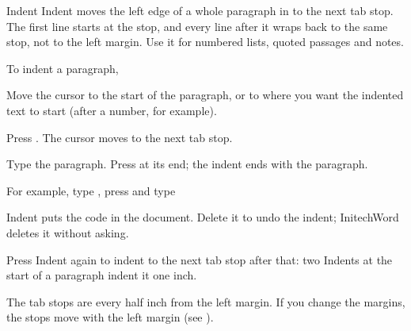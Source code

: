 \begin{Feature}{Indent}
Indent moves the left edge of a whole paragraph in to the next tab stop.
The first line starts at the stop, and every line after it wraps back to
the same stop, not to the left margin.  Use it for numbered lists, quoted
passages and notes.

To indent a paragraph,
\begin{WPSteps}
\item Move the cursor to the start of the paragraph, or to where you want
the indented text to start (after a number, for example).
\item Press .  The cursor moves to the next tab stop.
\item Type the paragraph.  Press  at its end; the indent ends with
the paragraph.
\end{WPSteps}

For example, type , press  and type
\EndReplay

\Notes
{}
Indent puts the code  in the document.  Delete it to
undo the indent; InitechWord deletes it without asking.

Press Indent again to indent to the next tab stop after that: two Indents at
the start of a paragraph indent it one inch.

The tab stops are every half inch from the left margin.  If you change the
margins, the stops move with the left margin (see ).

\end{Feature}

